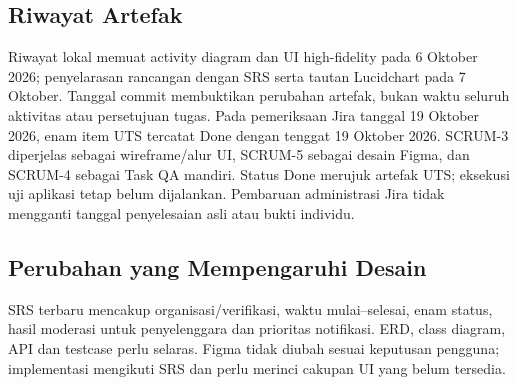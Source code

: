 \documentclass[11pt,a4paper]{article}
\begin{document}
\subsection{Riwayat Artefak}
Riwayat lokal memuat activity diagram dan UI high-fidelity pada 6 Oktober 2026; penyelarasan rancangan dengan SRS serta tautan Lucidchart pada 7 Oktober. Tanggal commit membuktikan perubahan artefak, bukan waktu seluruh aktivitas atau persetujuan tugas. Pada pemeriksaan Jira tanggal 19 Oktober 2026, enam item UTS tercatat Done dengan tenggat 19 Oktober 2026. SCRUM-3 diperjelas sebagai wireframe/alur UI, SCRUM-5 sebagai desain Figma, dan SCRUM-4 sebagai Task QA mandiri. Status Done merujuk artefak UTS; eksekusi uji aplikasi tetap belum dijalankan. Pembaruan administrasi Jira tidak mengganti tanggal penyelesaian asli atau bukti individu. \cite{jira}
\subsection{Perubahan yang Mempengaruhi Desain}
SRS terbaru mencakup organisasi/verifikasi, waktu mulai--selesai, enam status, hasil moderasi untuk penyelenggara dan prioritas notifikasi. ERD, class diagram, API dan testcase perlu selaras. Figma tidak diubah sesuai keputusan pengguna; implementasi mengikuti SRS dan perlu merinci cakupan UI yang belum tersedia.
\end{document}
